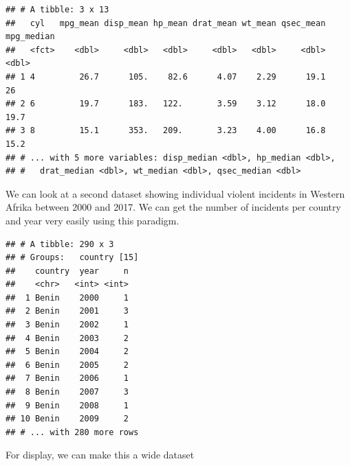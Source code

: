 \documentclass[12pt,letterpaperpaper,openany]{book}
\newenvironment{Shaded}{\begin{snugshade}}{\end{snugshade}}
\newcommand{\KeywordTok}[1]{\textcolor[rgb]{0.13,0.29,0.53}{\textbf{#1}}}
\newcommand{\NormalTok}[1]{#1}
\newcommand{\OperatorTok}[1]{\textcolor[rgb]{0.81,0.36,0.00}{\textbf{#1}}}
\newcommand{\StringTok}[1]{\textcolor[rgb]{0.31,0.60,0.02}{#1}}
\begin{document}
\begin{verbatim}
## # A tibble: 3 x 13
##   cyl   mpg_mean disp_mean hp_mean drat_mean wt_mean qsec_mean mpg_median
##   <fct>    <dbl>     <dbl>   <dbl>     <dbl>   <dbl>     <dbl>      <dbl>
## 1 4         26.7      105.    82.6      4.07    2.29      19.1       26  
## 2 6         19.7      183.   122.       3.59    3.12      18.0       19.7
## 3 8         15.1      353.   209.       3.23    4.00      16.8       15.2
## # ... with 5 more variables: disp_median <dbl>, hp_median <dbl>,
## #   drat_median <dbl>, wt_median <dbl>, qsec_median <dbl>
\end{verbatim}

We can look at a second dataset showing individual violent incidents in Western Afrika
between 2000 and 2017. We can get the number of incidents per country and year very easily using this paradigm.

\begin{Shaded}
\end{Shaded}

\begin{verbatim}
## # A tibble: 290 x 3
## # Groups:   country [15]
##    country  year     n
##    <chr>   <int> <int>
##  1 Benin    2000     1
##  2 Benin    2001     3
##  3 Benin    2002     1
##  4 Benin    2003     2
##  5 Benin    2004     2
##  6 Benin    2005     2
##  7 Benin    2006     1
##  8 Benin    2007     3
##  9 Benin    2008     1
## 10 Benin    2009     2
## # ... with 280 more rows
\end{verbatim}

For display, we can make this a wide dataset

\begin{Shaded}
\end{Shaded}
\end{document}
